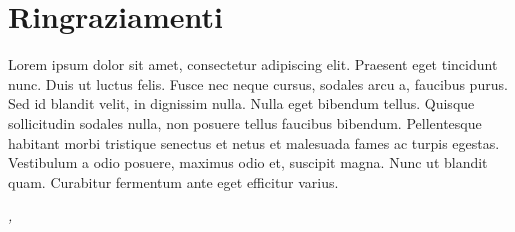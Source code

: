 \cleardoublepage
{}
{}

\bigskip

\begingroup
\let\clearpage\relax
\let\cleardoublepage\relax
\let\cleardoublepage\relax

\chapter*{Ringraziamenti}

Lorem ipsum dolor sit amet, consectetur adipiscing elit. Praesent eget tincidunt nunc. Duis ut luctus felis. Fusce nec neque cursus, sodales arcu a, faucibus purus. Sed id blandit velit, in dignissim nulla. Nulla eget bibendum tellus. Quisque sollicitudin sodales nulla, non posuere tellus faucibus bibendum. Pellentesque habitant morbi tristique senectus et netus et malesuada fames ac turpis egestas. Vestibulum a odio posuere, maximus odio et, suscipit magna. Nunc ut blandit quam. Curabitur fermentum ante eget efficitur varius.

\bigskip

\noindent\textit{\myLocation, \myTime}
\hfill \myName

\endgroup
